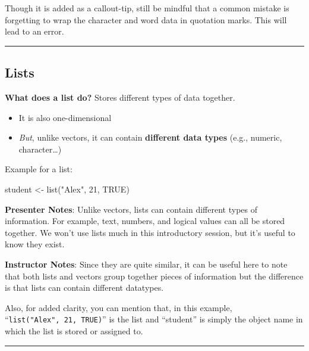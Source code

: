 \documentclass[
  letterpaper,
  DIV=11,
  numbers=noendperiod]{scrartcl}
\newenvironment{Shaded}{\begin{snugshade}}{\end{snugshade}}
\newcommand{\ConstantTok}[1]{\textcolor[rgb]{0.56,0.35,0.01}{#1}}
\newcommand{\DecValTok}[1]{\textcolor[rgb]{0.68,0.00,0.00}{#1}}
\newcommand{\FunctionTok}[1]{\textcolor[rgb]{0.28,0.35,0.67}{#1}}
\newcommand{\NormalTok}[1]{\textcolor[rgb]{0.00,0.23,0.31}{#1}}
\newcommand{\OtherTok}[1]{\textcolor[rgb]{0.00,0.23,0.31}{#1}}
\newcommand{\StringTok}[1]{\textcolor[rgb]{0.13,0.47,0.30}{#1}}
\providecommand{\tightlist}{%
  \setlength{\itemsep}{0pt}\setlength{\parskip}{0pt}}
\begin{document}
Though it is added as a callout-tip, still be mindful that a common
mistake is forgetting to wrap the character and word data in quotation
marks. This will lead to an error.

\begin{center}\rule{0.5\linewidth}{0.5pt}\end{center}

\subsection{Lists}\label{lists}

\textbf{What does a list do?} Stores different types of data together.

\begin{itemize}
\tightlist
\item
  It is also one-dimensional
\item
  \emph{But}, unlike vectors, it can contain \textbf{different data
  types} (e.g., numeric, character\ldots)
\end{itemize}

Example for a list:

\begin{Shaded}
\begin{Highlighting}[]
\NormalTok{student }\OtherTok{\textless{}{-}} \FunctionTok{list}\NormalTok{(}\StringTok{"Alex"}\NormalTok{, }\DecValTok{21}\NormalTok{, }\ConstantTok{TRUE}\NormalTok{)}
\end{Highlighting}
\end{Shaded}

\textbf{Presenter Notes}: Unlike vectors, lists can contain different
types of information. For example, text, numbers, and logical values can
all be stored together. We won't use lists much in this introductory
session, but it's useful to know they exist.

\textbf{Instructor Notes}: Since they are quite similar, it can be
useful here to note that both lists and vectors group together pieces of
information but the difference is that lists can contain different
datatypes.

Also, for added clarity, you can mention that, in this example,
``\texttt{list("Alex",\ 21,\ TRUE)}'' is the list and ``student'' is
simply the object name in which the list is stored or assigned to.

\begin{center}\rule{0.5\linewidth}{0.5pt}\end{center}
\end{document}

